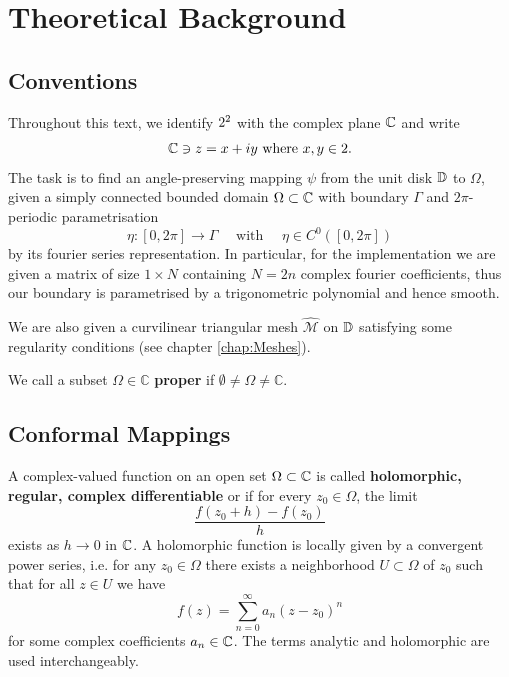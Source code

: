 \section{Theoretical Background}
\subsection*{Conventions}
Throughout this text, we identify $2^2$ with the complex plane $\mathbb{C}$ and write $$\mathbb{C}\ni z=x+iy \text{ where } x,y\in2.$$
The task is to find an angle-preserving mapping $\psi$ from the unit disk $\mathbb{D}$ to $\Omega$, given a simply connected bounded domain $\Omega\subset\mathbb{C}$ with boundary $\Gamma$ and $2\pi$-periodic parametrisation 
$$\eta: [0, 2\pi] \to \Gamma \quad \text{ with } \quad \eta \in C^0 ([0,2\pi])$$ by its fourier series representation. 
In particular, for the implementation we are given a matrix of size $1\times N$ containing $N=2n$ complex fourier coefficients, thus our boundary is parametrised by a trigonometric polynomial and hence smooth. \label{note:bdarySmooth}

We are also given a curvilinear triangular mesh $\widehat{\mathcal{M}}$ on $\mathbb{D}$ satisfying some regularity conditions (see chapter \ref{chap:Meshes}).

\begin{definition}
    We call a subset $\Omega \in \mathbb{C}$ \textbf{proper} if $\emptyset \neq \Omega \neq \mathbb{C}$.
\end{definition}


\subsection{Conformal Mappings}

\begin{definition} 
    A complex-valued function on an open set $\Omega \subset \mathbb{C}$ is called \textbf{holomorphic, regular, complex differentiable} or if for every $z_0 \in\Omega$, the limit
    $$ \frac{f(z_0+h)-f(z_0)}{h}$$ exists as $h \to 0$ in $\mathbb{C}$.
    A holomorphic function is locally given by a convergent power series, i.e. for any $z_0\in \Omega$ there exists a neighborhood $U\subset \Omega$ of $z_0$ such that for all $z\in U$ we have $$ f(z) = \sum_{n=0}^{\infty} a_n (z - z_0)^n $$ for some complex coefficients $a_n \in \mathbb{C}$.
    The terms analytic and holomorphic are used interchangeably.
\end{definition}

